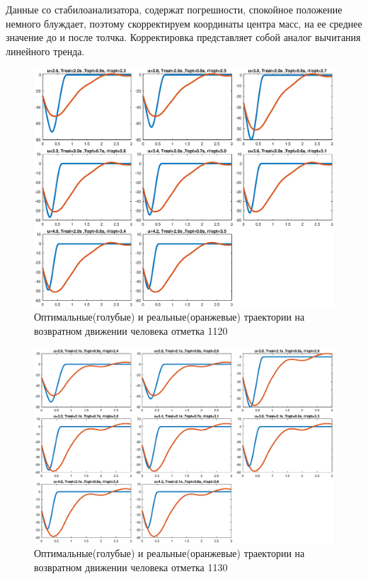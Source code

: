\documentclass[a4paper,12pt, openany]{book}
\theoremstyle{plain} %
\theoremstyle{definition} %
\theoremstyle{remark} %
\numberwithin{equation}{chapter}
\begin{document}
{Данные со стабилоанализатора, содержат погрешности, спокойное
положение немного блуждает, поэтому скорректируем координаты
центра масс, на ее среднее значение до и после толчка. Корректировка представляет собой аналог
вычитания линейного тренда.
\begin{figure}[h!]
    \centering
    \includegraphics[width=1\linewidth]{final_graphs.eps}
    \caption{Оптимальные(голубые) и реальные(оранжевые) траектории на возвратном движении человека отметка 1120}
    \label{final_graphs}
\end{figure}

\begin{figure}[h!]
    \centering
    \includegraphics[width=1\linewidth]{final_graphs_1.eps}
    \caption{Оптимальные(голубые) и реальные(оранжевые) траектории на возвратном движении человека отметка 1130}
    \label{final_graphs_1}
\end{figure}

}
\end{document}
